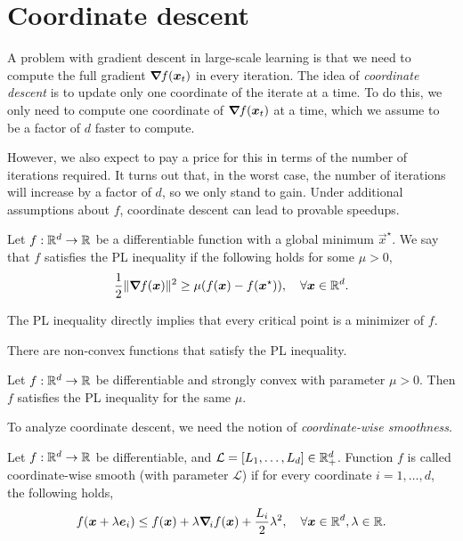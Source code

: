 \section{Coordinate descent}

A problem with gradient descent in large-scale learning is that we need to compute the full
gradient $\grad{f(\vec{x}_t)}{}$ in every iteration. The idea of \textit{coordinate descent} is to
update only one coordinate of the iterate at a time. To do this, we only need to compute one
coordinate of $\grad{f(\vec{x}_t)}{}$ at a time, which we assume to be a factor of $d$ faster to
compute.

However, we also expect to pay a price for this in terms of the number of iterations required. It
turns out that, in the worst case, the number of iterations will increase by a factor of $d$, so we
only stand to gain. Under additional assumptions about $f$, coordinate descent can lead to provable
speedups.

\begin{definition}
    Let $f: \R^d \to \R$ be a differentiable function with a global minimum $\vec{x}^\star$. We say
    that $f$ satisfies the PL inequality if the following holds for some $\mu > 0$, \[
        \frac{1}{2} \| \grad{f(\vec{x})}{} \|^2 \geq \mu (f(\vec{x}) - f(\vec{x}^\star)), \quad \forall \vec{x} \in \R^d.
    \]
\end{definition}

\begin{observation}
    The PL inequality directly implies that every critical point is a minimizer of $f$.
\end{observation}

There are non-convex functions that satisfy the PL inequality.

\begin{lemma}
    Let $f: \R^d \to \R$ be differentiable and strongly convex with parameter $\mu > 0$. Then $f$
    satisfies the PL inequality for the same $\mu$.
\end{lemma}

To analyze coordinate descent, we need the notion of \textit{coordinate-wise smoothness}.

\begin{definition}
    Let $f: \R^d \to \R$ be differentiable, and $\mathcal{L} = [L_1, \ldots, L_d] \in \R^d_+$.
    Function $f$ is called coordinate-wise smooth (with parameter $\mathcal{L}$) if for every
    coordinate $i=1,\ldots,d$, the following holds, \[
        f(\vec{x} + \lambda \vec{e}_i) \leq f(\vec{x}) + \lambda \grad{f(\vec{x})}{i} + \frac{L_i}{2} \lambda^2, \quad \forall \vec{x}\in \R^d, \lambda \in \R.
    \]
\end{definition}

